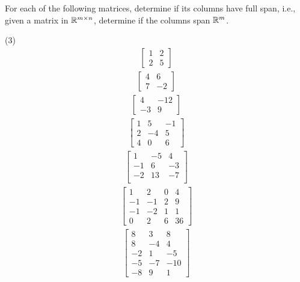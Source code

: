 For each of the following matrices, determine if its columns have full
span, i.e., given a matrix in $\mathbb R^{m \times n}$, determine if
the columns span $\mathbb R^m$.
\begin{tasks}[resume, style=enumerate](3)
\task
  \begin{align*}
    \begin{bmatrix}
      1 & 2 \\ 2 & 5
    \end{bmatrix}
  \end{align*}
\task
  \begin{align*}
    \begin{bmatrix}
      4 & 6 \\
      7 & -2
    \end{bmatrix}
  \end{align*}
\task
  \begin{align*}
    \begin{bmatrix}
      4 & -12 \\
      -3 & 9
    \end{bmatrix}
  \end{align*}
\task
  \begin{align*}
    \begin{bmatrix}
      1 & 5 & -1 \\
      2 & -4 & 5 \\
      4 & 0 & 6
    \end{bmatrix}
  \end{align*}
\task
  \begin{align*}
    \begin{bmatrix}
      1 & -5 & 4\\ -1 & 6 & -3\\ -2 & 13 & -7\\
    \end{bmatrix}
  \end{align*}
\task
  \begin{align*}
    \begin{bmatrix}
      1 & 2 & 0 & 4 \\ -1 & -1 & 2 & 9 \\ -1 & -2 & 1 & 1 \\ 0 & 2 & 6
      & 36
    \end{bmatrix}
  \end{align*}
\task
  \begin{align*}
    \begin{bmatrix}
      8 & 3 & 8 \\ 8 & -4 & 4 \\ -2 & 1 & -5 \\ -5 & -7 & -10 \\ -8 &
      9 & 1
    \end{bmatrix}
  \end{align*}
\end{tasks}


